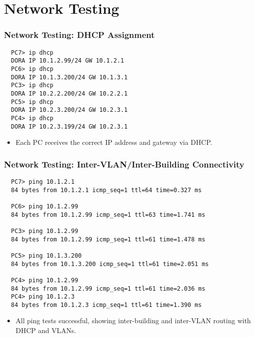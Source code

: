 \documentclass{beamer}
\begin{document}
  \section{Network Testing}

  \begin{frame}[fragile,label=testing-dhcp]
  \frametitle{Network Testing: DHCP Assignment}
  \begin{lstlisting}
  PC7> ip dhcp
  DORA IP 10.1.2.99/24 GW 10.1.2.1
  PC6> ip dhcp
  DORA IP 10.1.3.200/24 GW 10.1.3.1
  PC3> ip dhcp
  DORA IP 10.2.2.200/24 GW 10.2.2.1
  PC5> ip dhcp
  DORA IP 10.2.3.200/24 GW 10.2.3.1
  PC4> ip dhcp
  DORA IP 10.2.3.199/24 GW 10.2.3.1
  \end{lstlisting}
  \begin{itemize}
      \item Each PC receives the correct IP address and gateway via DHCP.
  \end{itemize}
  \end{frame}
  
  \begin{frame}[fragile,label=testing-ping]
  \frametitle{Network Testing: Inter-VLAN/Inter-Building Connectivity}
  \begin{lstlisting}
  PC7> ping 10.1.2.1
  84 bytes from 10.1.2.1 icmp_seq=1 ttl=64 time=0.327 ms
  
  PC6> ping 10.1.2.99
  84 bytes from 10.1.2.99 icmp_seq=1 ttl=63 time=1.741 ms
  
  PC3> ping 10.1.2.99
  84 bytes from 10.1.2.99 icmp_seq=1 ttl=61 time=1.478 ms
  
  PC5> ping 10.1.3.200
  84 bytes from 10.1.3.200 icmp_seq=1 ttl=61 time=2.051 ms
  
  PC4> ping 10.1.2.99
  84 bytes from 10.1.2.99 icmp_seq=1 ttl=61 time=2.036 ms
  PC4> ping 10.1.2.3
  84 bytes from 10.1.2.3 icmp_seq=1 ttl=61 time=1.390 ms
  \end{lstlisting}
  \begin{itemize}
      \item All ping tests successful, showing inter-building and inter-VLAN routing with DHCP and VLANs.
  \end{itemize}
  \end{frame}
\end{document}
